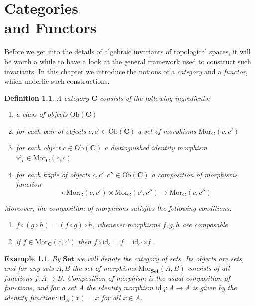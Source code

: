 \documentclass[11pt, letterpaper, oneside]{report}
\renewcommand{\chaptermark}[1]{\markboth{#1}{}}
\newcommand{\exercises}{
\vskip 10mm
\begin{tikzpicture}[scale=1]
\draw node[inner sep = 4pt, right,text width=\textwidth -8pt, fill= black!25]
{
\fontfamily{cyklop}\selectfont  \raisebox{-8pt}{Exercises to Chapter \arabic{chapter}}
 };
\end{tikzpicture}
}
\theoremstyle{pplain}
\theoremstyle{ddefinition}
\newtheorem{definition}[theorem]{Definition}
\newtheorem{example}[theorem]{Example}
\theoremstyle{nnn}
\theoremstyle{eexercise}
\newcommand{\Mor}{\mathrm{Mor}}
\newcommand{\Ob}{\mathrm{Ob}}
\newcommand{\id}{\mathrm{id}}
\newcommand{\CC}{{\mathbf C}}
\newcommand{\Set}{{\mathbf{Set}}}
\newcommand{\benu}{\begin{enumerate}}
\newcommand{\eenu}{\end{enumerate}}
\begin{document}





\newpage

\chapter[Categories and Functors]{Categories \\ and Functors}
\chaptermark{Categories and Functors}

\thispagestyle{firststyle}


Before we get into the details of algebraic invariants of topological spaces, it will be worth 
a while to have a look at  the general framework used 
to construct such invariants. In this chapter we introduce the notions of a \emph{category}
and a \emph{functor}, which underlie such constructions. 

\begin{definition}
\label{CATEGORY DEF}
A \emph{category} $\CC$ consists of the following ingredients:
\benu
\item[1)] a class of \emph{objects} $\Ob(\CC)$
\item[2)] for each pair of objects $c, c'\in\Ob(\CC)$ a set of \emph{morphisms} $\Mor_{\CC}(c, c')$ 
\item[3)] for each object $c \in \text{Ob}(\CC)$ a distinguished \emph{identity morphism} 
$\id_{c}\in \Mor_{\CC}(c, c)$
\item[4)] for each triple of objects $c, c', c''  \in \text{Ob}(\CC)$ a \emph{composition of morphisms} function
$$\circ \colon \Mor_{\CC}(c, c')\times \Mor_{\CC}(c', c'') \to \Mor_{\CC}(c, c'')$$
\eenu
Moreover, the composition of morphisms satisfies the following conditions:
\benu
\item[(i)] $f\circ(g\circ h) = (f\circ g)\circ h$, whenever morphisms $f, g, h$ are composable 
\item[(ii)] if $f\in \Mor_{\CC}(c, c')$ then $f\circ \id_{c} = f = \id_{c'}\circ f$. \eenu

\end{definition}
 
 
\begin{example}
\label{SET CAT EXAMPLE}
By  $\Set$ we will denote the category of sets. Its objects are  sets, and for any sets $A, B$
the set of morphisms $\Mor_{\Set}(A, B)$ consists of all functions $f\colon A \to B$.  Composition of morphism 
is the usual composition of functions, and for a set $A$ the identity morphism $\id_{A}\colon A \to A$
is given by the identity function: $\id_{A}(x) = x$ for all $x\in A$. 

\end{example}
\end{document}

